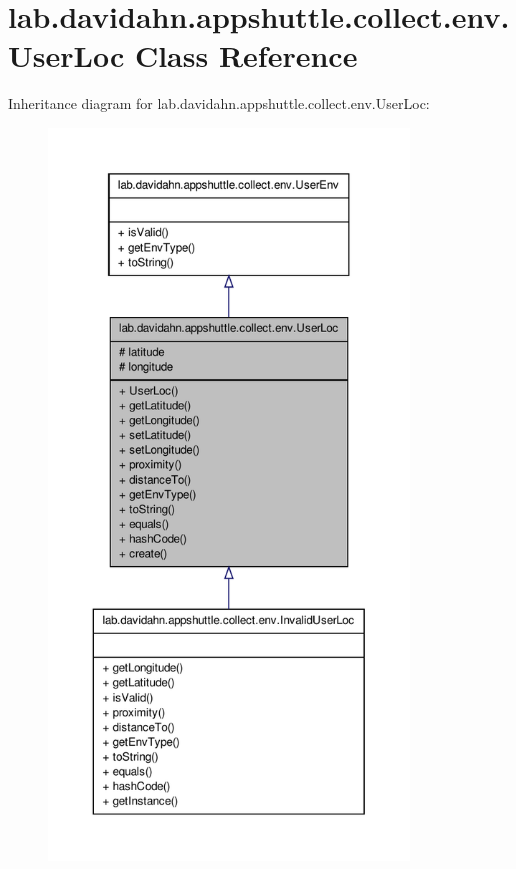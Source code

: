 \hypertarget{classlab_1_1davidahn_1_1appshuttle_1_1collect_1_1env_1_1_user_loc}{\section{lab.\-davidahn.\-appshuttle.\-collect.\-env.\-User\-Loc \-Class \-Reference}
\label{classlab_1_1davidahn_1_1appshuttle_1_1collect_1_1env_1_1_user_loc}
}


\-Inheritance diagram for lab.\-davidahn.\-appshuttle.\-collect.\-env.\-User\-Loc\-:
\nopagebreak
\begin{figure}[H]
\begin{center}
\leavevmode
\includegraphics[height=550pt]{classlab_1_1davidahn_1_1appshuttle_1_1collect_1_1env_1_1_user_loc__inherit__graph}
\end{center}
\end{figure}


